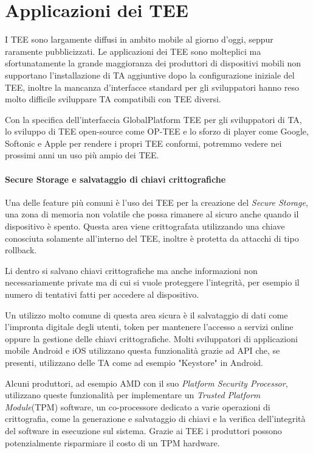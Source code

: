 \documentclass[12pt,italian]{report}
\begin{document}
\section{Applicazioni dei TEE}
\label{sec:applicazioni-tee}
I TEE sono largamente diffusi in ambito mobile al giorno d'oggi, seppur
raramente pubblicizzati.
Le applicazioni dei TEE sono molteplici ma sfortunatamente la grande
maggioranza dei produttori di dispositivi mobili non supportano
l'installazione di TA aggiuntive dopo la configurazione iniziale del TEE,
inoltre la mancanza d'interfacce standard per gli sviluppatori hanno reso
molto difficile sviluppare TA compatibili con TEE diversi.

Con la specifica dell'interfaccia GlobalPlatform TEE %
per gli sviluppatori di TA, lo sviluppo di TEE open-source come OP-TEE e lo
sforzo di player come Google, Softonic e Apple per rendere i propri TEE
conformi, potremmo vedere nei prossimi anni un uso più ampio dei TEE.

\paragraph{Secure Storage e salvataggio di chiavi crittografiche}

Una delle feature più comuni è l'uso dei TEE per la creazione del
\textit{Secure Storage}, una zona di memoria non volatile che possa rimanere
al sicuro anche quando il dispositivo è spento.
Questa area viene crittografata utilizzando una chiave conosciuta solamente
all'interno del TEE, inoltre è protetta da attacchi di tipo rollback.

Li dentro si salvano chiavi crittografiche ma anche informazioni non
necessariamente private ma di cui si vuole proteggere l'integrità, per esempio
il numero di tentativi fatti per accedere al dispositivo.

Un utilizzo molto comune di questa area sicura è il salvataggio di dati
come l'impronta digitale degli utenti, token per mantenere l'accesso a
servizi online oppure la gestione delle chiavi crittografiche.
Molti sviluppatori di applicazioni mobile Android e iOS utilizzano questa
funzionalità grazie ad API che, se presenti, utilizzano delle TA come ad
esempio "Keystore"\cite{androidkeystore} in Android.

Alcuni produttori, ad esempio AMD con il suo
\textit{Platform Security Processor}\cite{amd2020ftpm}, utilizzano queste
funzionalità per implementare un \textit{Trusted Platform Module}(TPM)
software, un co-processore dedicato a varie operazioni di crittografia, come
la generazione e salvataggio di chiavi e la verifica dell'integrità del
software in esecuzione sul sistema.
Grazie ai TEE i produttori possono potenzialmente risparmiare il costo di un
TPM hardware.
\end{document}
